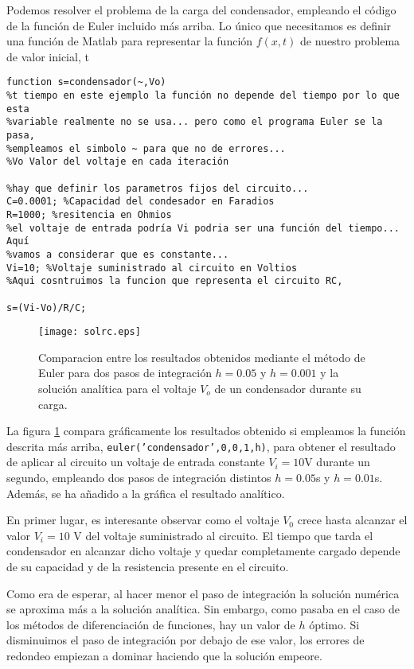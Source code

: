Podemos resolver el problema de la carga del condensador, empleando el código de la función de Euler incluido más arriba. Lo único que necesitamos es definir una función de Matlab  para representar la función $f(x,t)$ de nuestro problema de valor inicial,
t
\begin{verbatim}
function s=condensador(~,Vo)
%t tiempo en este ejemplo la función no depende del tiempo por lo que esta
%variable realmente no se usa... pero como el programa Euler se la pasa, 
%empleamos el simbolo ~ para que no de errores...
%Vo Valor del voltaje en cada iteración

%hay que definir los parametros fijos del circuito...
C=0.0001; %Capacidad del condesador en Faradios
R=1000; %resitencia en Ohmios
%el voltaje de entrada podría Vi podria ser una función del tiempo... Aquí
%vamos a considerar que es constante...
Vi=10; %Voltaje suministrado al circuito en Voltios
%Aqui cosntruimos la funcion que representa el circuito RC,

s=(Vi-Vo)/R/C;
\end{verbatim}

\begin{figure}[h]
\centering
\texttt{[image: solrc.eps]}
\caption{Comparacion entre los resultados obtenidos mediante el método de Euler para dos pasos de integración $h=0.05$ y $h=0.001$ y la solución analítica para el voltaje $V_o$ de un condensador durante su carga.}
\label{fig:solrc}
\end{figure}

La figura \ref{fig:solrc} compara gráficamente los resultados obtenido si empleamos la función descrita más arriba, \texttt{euler('condensador',0,0,1,h)}, para obtener el resultado de aplicar al circuito un voltaje de entrada constante $V_i=10$V durante un segundo, empleando dos pasos de integración distintos $h=0.05$s  y $h=0.01$s. Además, se ha añadido a la gráfica el resultado analítico.

En primer lugar, es interesante observar como el voltaje $V_0$ crece hasta alcanzar el valor $V_i=10$ V del voltaje suministrado al circuito. El tiempo que tarda el condensador en alcanzar dicho voltaje y quedar completamente cargado depende de su capacidad y de la resistencia presente en el circuito.

Como era de esperar, al hacer menor el paso de integración la solución numérica se aproxima más a la solución analítica. Sin embargo, como pasaba en el caso de los métodos de diferenciación de funciones, hay un valor de $h$ óptimo. Si disminuimos el paso de integración por debajo de ese valor, los errores de redondeo empiezan a dominar haciendo que la solución empeore.

